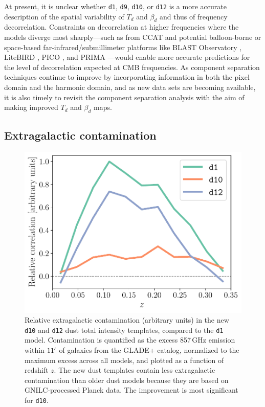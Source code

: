 \documentclass[twocolumn]{aastex631}
\begin{document}
At present, it is unclear whether \texttt{d1}, \texttt{d9}, \texttt{d10}, or \texttt{d12} is a more accurate description of the spatial variability of $T_d$ and $\beta_d$ and thus of frequency decorrelation. Constraints on decorrelation at higher frequencies where the models diverge most sharply---such as from CCAT \citep{CCAT-PrimeCollaboration:2023} and potential balloon-borne or space-based far-infrared/submillimeter platforms like BLAST Observatory \citep{Coppi:2024}, LiteBIRD \citep{LiteBIRDCollaboration:2023}, PICO \citep{Hanany:2019}, and PRIMA \citep{Dowell:2024}---would enable more accurate predictions for the level of decorrelation expected at CMB frequencies. As component separation techniques continue to improve by incorporating information in both the pixel domain and the harmonic domain, and as new data sets are becoming available, it is also timely to revisit the component separation analysis with the aim of making improved $T_d$ and $\beta_d$ maps.

\subsection{Extragalactic contamination} \label{sec:CIBcontamination}

\begin{figure}[ht!]
    \centering
    \includegraphics[width=\columnwidth]{figures/quantifycontamination_PySMpaperstyle.pdf}
    \caption{Relative extragalactic contamination (arbitrary units) in the new \texttt{d10} and \texttt{d12} dust total intensity templates, compared to the \texttt{d1} model. Contamination is quantified as the excess 857\,GHz emission within $11\mbox{$^\prime$}$ of galaxies from the GLADE+ catalog, normalized to the maximum excess across all models, and plotted as a function of redshift $z$. The new dust templates contain less extragalactic contamination than older dust models because they are based on GNILC-processed Planck data. The improvement is most significant for \texttt{d10}.}
    \label{fig:extragal_contamination}
\end{figure}
\end{document}

